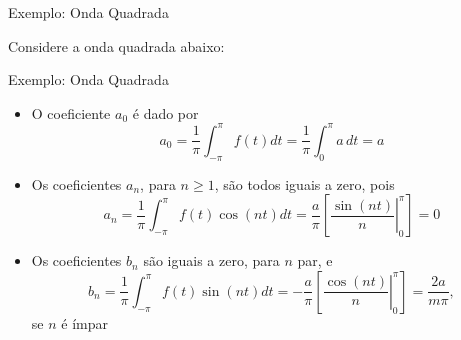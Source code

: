 \begin{frame}[fragile]{Exemplo: Onda Quadrada}

    Considere a onda quadrada abaixo:

    \begin{figure}
        \centering

    \end{figure}

\end{frame}

\begin{frame}[fragile]{Exemplo: Onda Quadrada}

    \begin{itemize}
        \item O coeficiente $a_0$ é dado por
        \[
            a_0 = \frac{1}{\pi}\int_{-\pi}^{\pi} f(t)dt = \frac{1}{\pi}\int_{0}^{\pi} a\, dt = a
        \]

        \item Os coeficientes $a_n$, para $n\geq 1$, são todos iguais a zero, pois
        \[
            a_n = \frac{1}{\pi}\int_{-\pi}^{\pi} f(t)\cos(nt) dt 
                = \frac{a}{\pi}\left[\left.\frac{\sin(nt)}{n}\right\rvert_0^\pi\right] = 0
        \]

        \item Os coeficientes $b_n$ são iguais a zero, para $n$ par, e
        \[
            b_n = \frac{1}{\pi}\int_{-\pi}^{\pi} f(t)\sin(nt) dt 
                = -\frac{a}{\pi}\left[\left.\frac{\cos(nt)}{n}\right\rvert_0^\pi\right] = \frac{2a}{m\pi},
        \]
        se $n$ é ímpar
    \end{itemize}

\end{frame}

